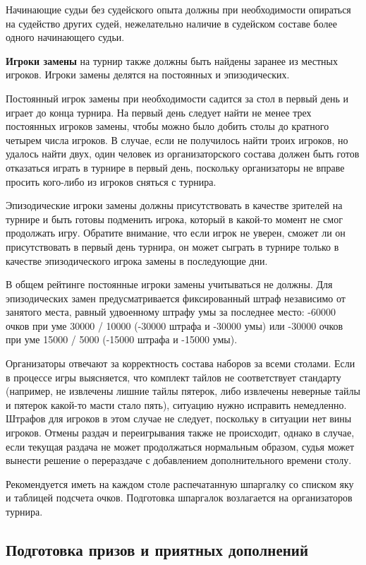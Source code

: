 Начинающие судьи без судейского опыта должны при необходимости опираться на судейство других судей, нежелательно наличие в судейском составе более одного начинающего судьи.

\textbf{Игроки замены} на турнир также должны быть найдены заранее из местных игроков. Игроки замены делятся на постоянных и эпизодических. 

Постоянный игрок замены при необходимости садится за стол в первый день и играет до конца турнира. На первый день следует найти не менее трех постоянных игроков замены, чтобы можно было добить столы до кратного четырем числа игроков. В случае, если не получилось найти троих игроков, но удалось найти двух, один человек из организаторского состава должен быть готов отказаться играть в турнире в первый день, поскольку организаторы не вправе просить кого-либо из игроков сняться с турнира.

Эпизодические игроки замены должны присутствовать в качестве зрителей на турнире и быть готовы подменить игрока, который в какой-то момент не смог продолжать игру. Обратите внимание, что если игрок не уверен, сможет ли он присутствовать в первый день турнира, он может сыграть в турнире только в качестве эпизодического игрока замены в последующие дни. 

В общем рейтинге постоянные игроки замены учитываться не должны. Для эпизодических замен предусматривается фиксированный штраф независимо от занятого места, равный удвоенному штрафу умы за последнее место: -60000 очков при уме 30000 / 10000 (-30000 штрафа и -30000 умы) или -30000 очков при уме 15000 / 5000 (-15000 штрафа и -15000 умы).

Организаторы отвечают за корректность состава наборов за всеми столами. Если в процессе игры выясняется, что комплект тайлов не соответствует стандарту (например, не извлечены лишние тайлы пятерок, либо извлечены неверные тайлы и пятерок какой-то масти стало пять), ситуацию нужно исправить немедленно. Штрафов для игроков в этом случае не следует, поскольку в ситуации нет вины игроков. Отмены раздач и переигрывания также не происходит, однако в случае, если текущая раздача не может продолжаться нормальным образом, судья может вынести решение о перераздаче с добавлением дополнительного времени столу.

Рекомендуется иметь на каждом столе распечатанную шпаргалку со списком яку и таблицей подсчета очков. Подготовка шпаргалок возлагается на организаторов турнира.

\subsection{Подготовка призов и приятных дополнений}

